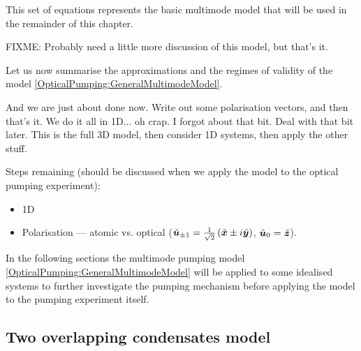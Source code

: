 This set of equations represents the basic multimode model that will be used in the remainder of this chapter.

FIXME: Probably need a little more discussion of this model, but that's it.

\parasep

Let us now summarise the approximations and the regimes of validity of the model \eqref{OpticalPumping:GeneralMultimodeModel}.

And we are just about done now.  Write out some polarisation vectors, and then that's it.  We do it all in 1D... oh crap. I forgot about that bit.  Deal with that bit later. This is the full 3D model, then consider 1D systems, then apply the other stuff.

Steps remaining (should be discussed when we apply the model to the optical pumping experiment):
\begin{itemize}
    \item 1D
    \item Polarisation --- atomic vs. optical ($\check{\bm{u}}_{\pm1} = \frac{1}{\sqrt{2}}\left(\check{\bm{x}} \pm i \check{\bm{y}}\right)$, $\check{\bm{u}}_0 = \check{\bm{z}}$).
\end{itemize}

In the following sections the multimode pumping model \eqref{OpticalPumping:GeneralMultimodeModel} will be applied to some idealised systems to further investigate the pumping mechanism before applying the model to the pumping experiment itself.

\subsection{Two overlapping condensates model}
\label{OpticalPumping:SimpleModels:OverlappingCondensatesModel}

